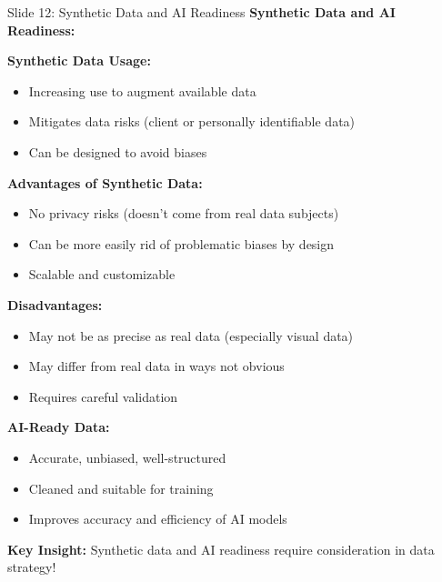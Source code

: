 \documentclass[8pt]{beamer}
\begin{document}
	\begin{frame}{Slide 12: Synthetic Data and AI Readiness}
		\fontsize{6.5}{7.5}\selectfont
		\textbf{Synthetic Data and AI Readiness:}
		
		\vspace{0.1cm}
		\textbf{Synthetic Data Usage:}
		\begin{itemize}
			\item Increasing use to augment available data
			\item Mitigates data risks (client or personally identifiable data)
			\item Can be designed to avoid biases
		\end{itemize}
		
		\vspace{0.1cm}
		\textbf{Advantages of Synthetic Data:}
		\begin{itemize}
			\item No privacy risks (doesn't come from real data subjects)
			\item Can be more easily rid of problematic biases by design
			\item Scalable and customizable
		\end{itemize}
		
		\vspace{0.1cm}
		\textbf{Disadvantages:}
		\begin{itemize}
			\item May not be as precise as real data (especially visual data)
			\item May differ from real data in ways not obvious
			\item Requires careful validation
		\end{itemize}
		
		\vspace{0.1cm}
		\textbf{AI-Ready Data:}
		\begin{itemize}
			\item Accurate, unbiased, well-structured
			\item Cleaned and suitable for training
			\item Improves accuracy and efficiency of AI models
		\end{itemize}
		
		\textcolor{myblue}{\textbf{Key Insight:}} Synthetic data and AI readiness \textcolor{myblue}{require consideration in data strategy}!
	\end{frame}
	
\end{document}
